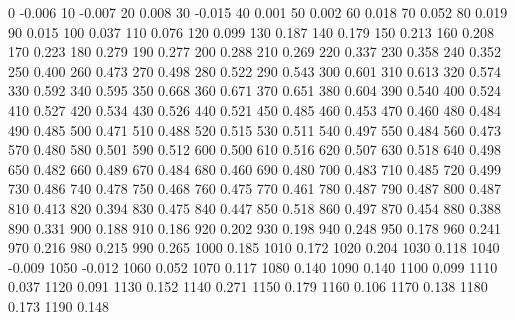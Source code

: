 0 -0.006
10 -0.007
20 0.008
30 -0.015
40 0.001
50 0.002
60 0.018
70 0.052
80 0.019
90 0.015
100 0.037
110 0.076
120 0.099
130 0.187
140 0.179
150 0.213
160 0.208
170 0.223
180 0.279
190 0.277
200 0.288
210 0.269
220 0.337
230 0.358
240 0.352
250 0.400
260 0.473
270 0.498
280 0.522
290 0.543
300 0.601
310 0.613
320 0.574
330 0.592
340 0.595
350 0.668
360 0.671
370 0.651
380 0.604
390 0.540
400 0.524
410 0.527
420 0.534
430 0.526
440 0.521
450 0.485
460 0.453
470 0.460
480 0.484
490 0.485
500 0.471
510 0.488
520 0.515
530 0.511
540 0.497
550 0.484
560 0.473
570 0.480
580 0.501
590 0.512
600 0.500
610 0.516
620 0.507
630 0.518
640 0.498
650 0.482
660 0.489
670 0.484
680 0.460
690 0.480
700 0.483
710 0.485
720 0.499
730 0.486
740 0.478
750 0.468
760 0.475
770 0.461
780 0.487
790 0.487
800 0.487
810 0.413
820 0.394
830 0.475
840 0.447
850 0.518
860 0.497
870 0.454
880 0.388
890 0.331
900 0.188
910 0.186
920 0.202
930 0.198
940 0.248
950 0.178
960 0.241
970 0.216
980 0.215
990 0.265
1000 0.185
1010 0.172
1020 0.204
1030 0.118
1040 -0.009
1050 -0.012
1060 0.052
1070 0.117
1080 0.140
1090 0.140
1100 0.099
1110 0.037
1120 0.091
1130 0.152
1140 0.271
1150 0.179
1160 0.106
1170 0.138
1180 0.173
1190 0.148
